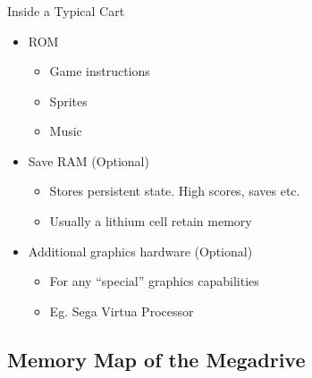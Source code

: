 \documentclass{beamer}
\begin{document}

\begin{frame}[fragile]

\frametitle{\insertsubsection}

\begin{block}{Inside a Typical Cart}
\begin{itemize}
\item ROM
\begin{itemize}
\item Game instructions
\item Sprites
\item Music
\end{itemize}
\vfill

\item Save RAM (Optional)
\begin{itemize}
\item Stores persistent state. High scores, saves etc.
\item Usually a lithium cell retain memory
\end{itemize}
\vfill

\item Additional graphics hardware (Optional)
\begin{itemize}
\item For any ``special'' graphics capabilities
\item Eg. Sega Virtua Processor
\end{itemize}
\end{itemize}
\end{block}

\end{frame}


\subsection{Memory Map of the Megadrive}
\end{document}
